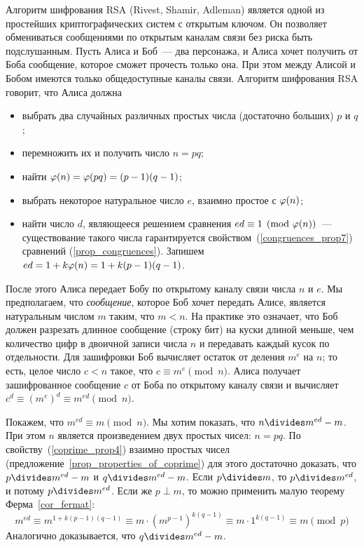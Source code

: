 Алгоритм шифрования RSA (Rivest, Shamir, Adleman) является одной из
простейших криптографических систем с открытым ключом. Он позволяет
обмениваться сообщениями по открытым каналам связи без риска быть
подслушанным. Пусть Алиса и Боб~--- два персонажа, и Алиса хочет
получить от Боба сообщение, которое сможет прочесть только она. При
этом между Алисой и Бобом имеются только общедоступные каналы
связи. Алгоритм шифрования RSA говорит, что Алиса должна
\begin{itemize}
\item выбрать два случайных различных простых числа (достаточно
  больших) $p$ и $q$;
\item перемножить их и получить число $n=pq$;
\item найти $\varphi(n)=\varphi(pq)=(p-1)(q-1)$;
\item выбрать некоторое натуральное число $e$, взаимно простое с
  $\varphi(n)$;
\item найти число $d$, являющееся решением сравнения $ed\equiv
  1\pmod{\varphi(n)}$~--- существование такого числа гарантируется
  свойством~(\ref{congruences_prop7}) сравнений
  (\ref{prop_congruences}). Запишем $ed=1+k\varphi(n) = 1 + k(p-1)(q-1)$.
\end{itemize}
После этого Алиса передает Бобу по открытому каналу связи числа $n$ и $e$.
Мы предполагаем, что {\it сообщение}, которое Боб хочет передать
Алисе, является натуральным числом $m$ таким, что $m<n$. На практике
это означает, что Боб должен разрезать длинное сообщение (строку бит)
на куски длиной меньше, чем количество цифр в двоичной записи числа
$n$ и передавать каждый кусок по отдельности.
Для зашифровки Боб вычисляет остаток от деления $m^e$ на $n$; то есть,
целое число $c<n$ такое, что $c\equiv m^e\pmod{n}$.
Алиса получает зашифрованное сообщение $c$ от Боба по открытому каналу
связи и вычисляет $c^d\equiv (m^e)^d\equiv m^{ed}\pmod{n}$.

Покажем, что $m^{ed}\equiv m\pmod{n}$. Мы хотим показать, что
$n\divides m^{ed}-m$. При этом $n$ является произведением двух простых
чисел: $n=pq$. По свойству~(\ref{coprime_prop4}) взаимно простых чисел
(предложение~\ref{prop_properties_of_coprime}) для этого достаточно
доказать, что $p\divides m^{ed}-m$ и $q\divides m^{ed}-m$.
Если $p\divides m$, то $p\divides m^{ed}$, и потому $p\divides
m^{ed}$. Если же $p\perp m$, то
можно применить малую теорему Ферма~\ref{cor_fermat}:
$$
m^{ed}\equiv m^{1+k(p-1)(q-1)} \equiv m\cdot (m^{p-1})^{k(q-1)}
\equiv m\cdot 1^{k(q-1)} \equiv m \pmod{p}
$$
Аналогично доказывается, что $q\divides m^{ed}-m$.

